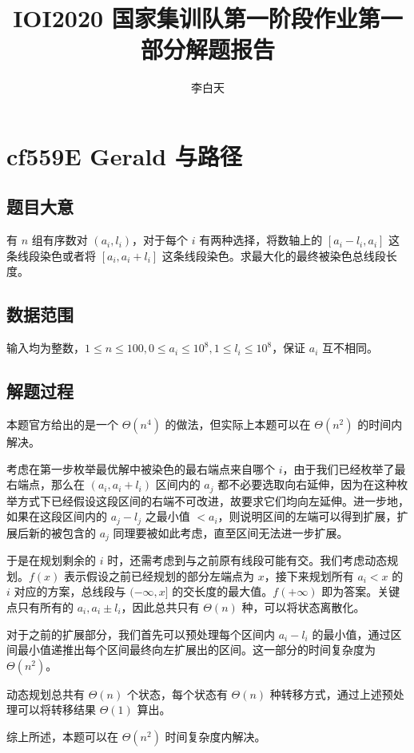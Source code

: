 \documentclass[12pt]{ctexart}
\title{IOI2020 国家集训队第一阶段作业第一部分解题报告}
\author{李白天}
\begin{document}
\maketitle

\section{cf559E Gerald 与路径}

\subsection{题目大意}

有 $n$ 组有序数对 $(a_i, l_i)$，对于每个 $i$ 有两种选择，将数轴上的 $[a_i - l_i, a_i]$ 这条线段染色或者将 $[a_i, a_i + l_i]$ 这条线段染色。求最大化的最终被染色总线段长度。

\subsection{数据范围}

输入均为整数，$1\le n\le 100, 0\le a_i\le 10^8, 1\le l_i\le 10^8$，保证 $a_i$ 互不相同。

\subsection{解题过程}

本题官方给出的是一个 $\Theta(n^4)$ 的做法，但实际上本题可以在 $\Theta(n^2)$ 的时间内解决。

考虑在第一步枚举最优解中被染色的最右端点来自哪个 $i$，由于我们已经枚举了最右端点，那么在 $(a_i, a_i + l_i)$ 区间内的 $a_j$ 都不必要选取向右延伸，因为在这种枚举方式下已经假设这段区间的右端不可改进，故要求它们均向左延伸。进一步地，如果在这段区间内的 $a_j - l_j$ 之最小值 $< a_i$，则说明区间的左端可以得到扩展，扩展后新的被包含的 $a_j$ 同理要被如此考虑，直至区间无法进一步扩展。

于是在规划剩余的 $i$ 时，还需考虑到与之前原有线段可能有交。我们考虑动态规划。$f(x)$ 表示假设之前已经规划的部分左端点为 $x$，接下来规划所有 $a_i < x$ 的 $i$ 对应的方案，总线段与 $(-\infty, x]$ 的交长度的最大值。$f(+\infty)$ 即为答案。关键点只有所有的 $a_i, a_i\pm l_i$，因此总共只有 $\Theta(n)$ 种，可以将状态离散化。

对于之前的扩展部分，我们首先可以预处理每个区间内 $a_i - l_i$ 的最小值，通过区间最小值递推出每个区间最终向左扩展出的区间。这一部分的时间复杂度为 $\Theta(n^2)$。

动态规划总共有 $\Theta(n)$ 个状态，每个状态有 $\Theta(n)$ 种转移方式，通过上述预处理可以将转移结果 $\Theta(1)$ 算出。

综上所述，本题可以在 $\Theta(n^2)$ 时间复杂度内解决。
\end{document}
